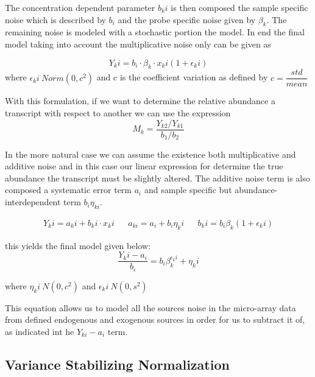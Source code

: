 \documentclass[a4paper,11pt,twoside]{book}
\begin{document}
	The concentration dependent parameter $b_ki$ is then composed the sample specific noise which is described by $b_i$ and the probe specific noise given by $\beta_k$. The remaining noise is modeled with a stochastic portion the model. In end the final model taking into account the multiplicative noise only can be given as
	
	$$ Y_ki = b_i\cdot\beta_k{\cdot}x_ki ( 1 + \epsilon_ki) $$ 
	where $ \epsilon_ki ~ Norm(0,c^2)$ and c is the coefficient variation as defined by $c = \dfrac{std}{mean}$
	
	With this formulation, if we want to determine the relative abundance a transcript with respect to another we can use the expression
	$$ M_k = \dfrac{Y_{k2}/Y_{k1}}{b_1/b_2} $$
	
	In the more natural case we can assume the existence both multiplicative and additive noise and in this case our linear expression for determine the true abundance the transcript must be slightly altered. The additive noise term is also composed a systematic error term $a_i$ and sample specific but abundance-interdependent term $b_i\eta_{ki}$. 
	
	\begin{align}
	Y_ki = a_ki + b_ki \cdot x_ki && a_{ki} = a_i + b_i\eta_ki && b_ki = b_i\beta_k(1+\epsilon_ki)
	\end{align}
	
	this yields the final model given below: 
	$$\dfrac{Y_ki - a_i}{b_i} = b_i\beta_k^{\epsilon_ki} + \eta_ki$$
	
	\begin{center}
		where $\eta_ki ~ N(0,c^2)$ and $\epsilon_ki ~ N(0,s^2) $
	\end{center}
	
	This equation allows us to model all the sources noise in the micro-array data from defined endogenous and exogenous sources in order for us to subtract it of, as indicated int he $Y_{ki} - a_i$ term. 
	
	\subsection{Variance Stabilizing Normalization}
	
\end{document}
